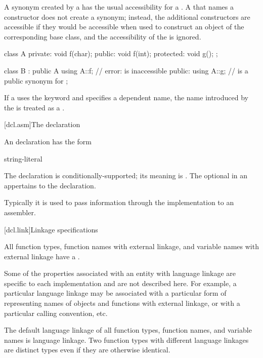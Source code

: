 \pnum
A synonym created by a  has the usual
accessibility for a .
A  that names a constructor does not
create a synonym; instead, the additional constructors
are accessible if they would be accessible
when used to construct an object of the corresponding base class,
and the accessibility of the  is ignored.
\begin{example}

\begin{codeblock}
class A {
private:
    void f(char);
public:
    void f(int);
protected:
    void g();
};

class B : public A {
  using A::f;       // error:  is inaccessible
public:
  using A::g;       //  is a public synonym for 
};
\end{codeblock}
\end{example}

\pnum
If a  uses the keyword  and
specifies a dependent name, the name introduced by the
 is treated as a
.%

[dcl.asm]{The  declaration}%
%
%

\pnum
An  declaration has the form

\begin{bnf}
\br
      string-literal \terminal{) ;}
\end{bnf}

The  declaration is conditionally-supported; its meaning is
.
The optional  in
an  appertains to the  declaration.
\begin{note}
Typically it is used to pass information through the implementation to
an assembler.
\end{note}

[dcl.link]{Linkage specifications}%

\pnum
All function types, function names with external linkage, and variable
names with external linkage have a .
\begin{note}
Some of the properties associated with an entity with language linkage
are specific to each implementation and are not described here. For
example, a particular language linkage may be associated with a
particular form of representing names of objects and functions with
external linkage, or with a particular calling convention, etc.
\end{note}
The default language linkage of all function types, function names, and
variable names is \Cpp{} language linkage. Two function types with
different language linkages are distinct types even if they are
otherwise identical.

